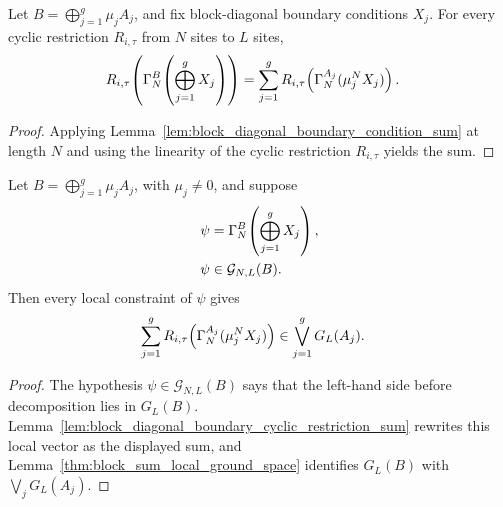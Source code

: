\begin{lemma}
    \label{lem:block_diagonal_boundary_cyclic_restriction_sum}
    \leanok
    Let $B=\bigoplus_{j=1}^g\mu_jA_j$, and fix block-diagonal boundary
    conditions $X_j$. For every cyclic restriction $R_{i,\tau}$ from
    $N$ sites to $L$ sites,
    \begin{align}
        R_{i,\tau}\!\left(\Gamma_N^B\!\left(\bigoplus_{j=1}^gX_j\right)\right)
         & =
        \sum_{j=1}^g
        R_{i,\tau}\!\left(\Gamma_N^{A_j}(\mu_j^NX_j)\right).
        \notag
    \end{align}
\end{lemma}

\begin{proof}
    \leanok
    Applying Lemma~\ref{lem:block_diagonal_boundary_condition_sum} at length $N$
    and using the linearity of the cyclic restriction $R_{i,\tau}$ yields the sum.
\end{proof}

\begin{lemma}
    \label{lem:block_diagonal_boundary_local_sum_mem}
    \leanok
    Let $B=\bigoplus_{j=1}^g\mu_jA_j$, with $\mu_j\ne0$, and suppose
    \begin{align}
        \psi
         & =
        \Gamma_N^B\!\left(\bigoplus_{j=1}^gX_j\right),
        \notag                     \\
        \psi
         & \in\mathcal G_{N,L}(B).
        \notag
    \end{align}
    Then every local constraint of $\psi$ gives
    \begin{align}
        \sum_{j=1}^g
        R_{i,\tau}\!\left(\Gamma_N^{A_j}(\mu_j^NX_j)\right)
         & \in
        \bigvee_{j=1}^gG_L(A_j).
        \notag
    \end{align}
\end{lemma}

\begin{proof}
    \leanok
    The hypothesis $\psi\in\mathcal G_{N,L}(B)$ says that the left-hand side
    before decomposition lies in $G_L(B)$.
    Lemma~\ref{lem:block_diagonal_boundary_cyclic_restriction_sum} rewrites this
    local vector as the displayed sum, and
    Lemma~\ref{thm:block_sum_local_ground_space} identifies $G_L(B)$ with
    $\bigvee_jG_L(A_j)$.

\end{proof}


